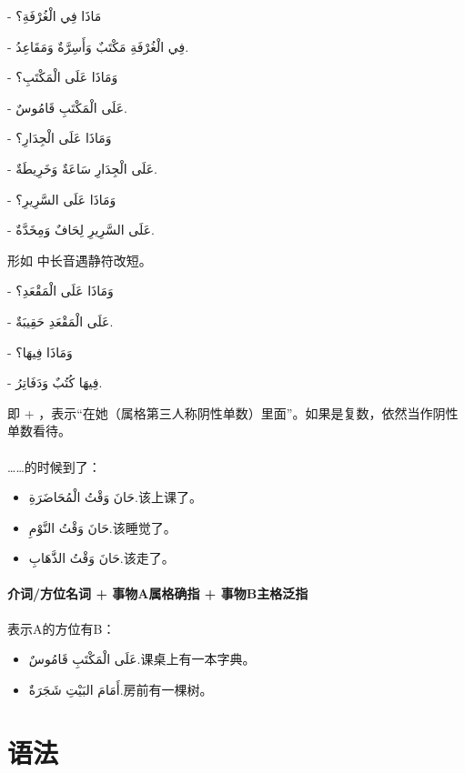 \begin{Arabic}
    - مَاذَا فِي الْغُرْفَةِ؟

    - فِي الْغُرْفَةِ مَكْتَبٌ وَأَسِرَّةٌ وَمَقَاعِدُ.

    - وَمَاذَا عَلَى الْمَكْتَبِ؟

    - عَلَى الْمَكْتَبِ قَامُوسٌ.

    - وَمَاذَا عَلَى الْجِدَارِ؟

    - عَلَى الْجِدَارِ سَاعَةٌ وَخَرِيطَةٌ.

    - وَمَاذَا عَلَى السَّرِيرِ؟

    - عَلَى السَّرِيرِ لِحَافٌ وَمِخَدَّةٌ.

\end{Arabic}

\begin{note}
    形如  中长音遇静符改短。
\end{note}

\begin{Arabic}
    - وَمَاذَا عَلَى الْمَقْعَدِ؟

    - عَلَى الْمَقْعَدِ حَقِيبَةٌ.

    - وَمَاذَا فِيهَا؟

    - فِيهَا كُتُبٌ وَدَفَاتِرُ.
\end{Arabic}

\begin{note}
     即  +  ，表示``在她（属格第三人称阴性单数）里面''。如果是复数，依然当作阴性单数看待。
\end{note}

\paragraph{} ……的时候到了：
\begin{itemize}
    \item \ac{حَانَ وَقْتُ الْمُحَاضَرَةِ.}{该上课了。}
    \item \ac{حَانَ وَقْتُ النَّوْمِ.}{该睡觉了。}
    \item \ac{حَانَ وَقْتُ الذَّهَابِ.}{该走了。}
\end{itemize}

\paragraph{介词/方位名词 + 事物A属格确指 + 事物B主格泛指} 表示A的方位有B：
\begin{itemize}
    \item \ac{عَلَى الْمَكْتَبِ قَامُوسٌ.}{课桌上有一本字典。}
    \item \ac{أَمَامَ البَيْتِ شَجَرَةٌ.}{房前有一棵树。}
\end{itemize}

\section{语法}